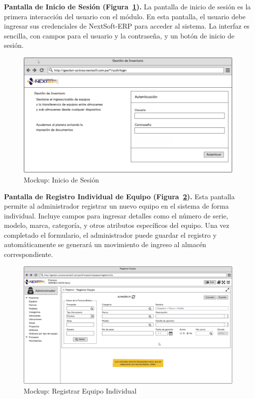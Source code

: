 \documentclass[stu, 12pt, letterpaper, donotrepeattitle, floatsintext, natbib]{apa7}
\begin{document}
\textbf{Pantalla de Inicio de Sesión (Figura~\ref{login}). }La pantalla de inicio de sesión es la primera interacción del usuario con el
módulo. En esta pantalla, el usuario debe ingresar sus credenciales de NextSoft-ERP para acceder al sistema. La interfaz es sencilla, con
campos para el usuario y la contraseña, y un botón de inicio de sesión.
\begin{figure}[H]
    \centering
    \caption{Mockup: Inicio de Sesión}\label{login}
    \includegraphics[width=16.5cm, angle=0]{./images/login.png}
\end{figure}
\textbf{Pantalla de Registro Individual de Equipo (Figura~\ref{individual}). }Esta pantalla permite al administrador registrar un nuevo equipo
en el sistema de forma individual. Incluye campos para ingresar detalles como el número de serie, modelo, marca, categoría, y otros atributos
específicos del equipo. Una vez completado el formulario, el administrador puede guardar el registro y automáticamente se generará un
movimiento de ingreso al almacén correspondiente.
\begin{figure}[H]
    \centering
    \caption{Mockup: Registrar Equipo Individual}\label{individual}
    \includegraphics[width=16.5cm, angle=0]{./images/registroIndividual.png}
\end{figure}
\end{document}
